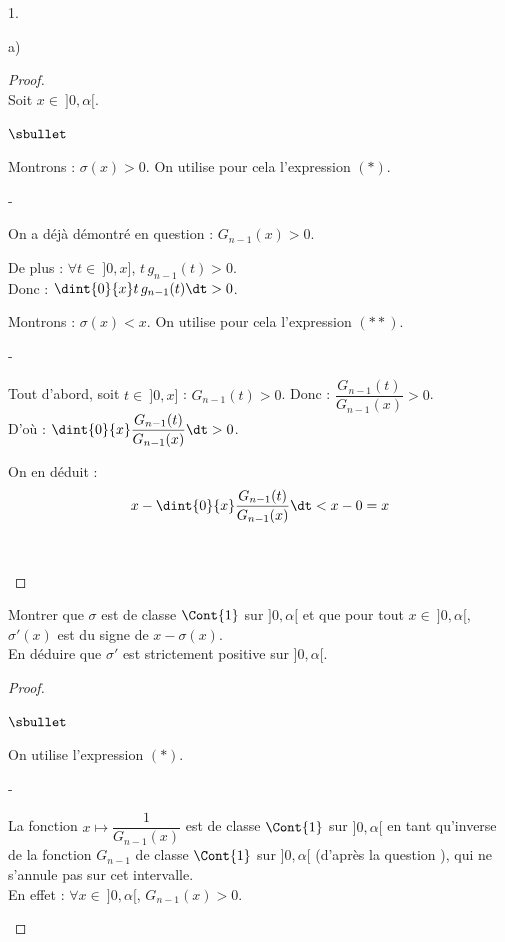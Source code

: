 \begin{noliste}{1.}
\begin{noliste}{a)}
    \begin{proof}~\\
      Soit $x \in \ ]0,\alpha[$.
      \begin{noliste}{$\sbullet$}
	\item Montrons : $\sigma(x) >0$. On utilise pour cela 
	l'expression $(*)$.
	\begin{noliste}{-}
	  \item On a déjà démontré en question  : 
	  $G_{n-1}(x) >0$.
	  
	  \item De plus : $\forall t \in \ ]0,x]$, $t \, g_{n-1}(t)
	  >0$.\\[.1cm]
	  Donc : $\dint{0}{x} t \, g_{n-1}(t) \dt >0$.
	\end{noliste}
	
	\item Montrons : $\sigma(x) < x$. On utilise pour cela 
	l'expression $(**)$.
	\begin{noliste}{-}
	  \item Tout d'abord, soit $t \in \ ]0,x]$ : 
	  $G_{n-1}(t) >0$. Donc : $\dfrac{G_{n-1}(t)}{G_{n-1}(x)}
	  >0$.\\[.1cm]
	  D'où : $\dint{0}{x} \dfrac{G_{n-1}(t)}{G_{n-1}(x)} \dt >0$.
	  
	  \item On en déduit :
	  \[
	    x - \dint{0}{x} \dfrac{G_{n-1}(t)}{G_{n-1}(x)} \dt
	    < x-0 = x
	  \]
	\end{noliste}
	~\\[-1.6cm]
      \end{noliste}
    \end{proof}

    
    \item Montrer que $\sigma$ est de classe $\Cont{1}$ sur $]0,\alpha[$
    et que pour tout $x \in \ ]0,\alpha[$, $\sigma'(x)$ est du signe 
    de $x- \sigma(x)$.\\
    En déduire que $\sigma'$ est strictement positive sur $]0,\alpha[$.
    
    \begin{proof}~
      \begin{noliste}{$\sbullet$}
	\item On utilise l'expression $(*)$.
	\begin{noliste}{-}
	  \item La fonction $x \mapsto \dfrac{1}{G_{n-1}(x)}$ est de 
	  classe $\Cont{1}$ sur $]0, \alpha[$ en tant qu'inverse de 
	  la fonction $G_{n-1}$ de classe $\Cont{1}$ sur $]0,\alpha[$
	  (d'après la question ), qui ne s'annule pas 
	  sur cet intervalle.\\
	  En effet : $\forall x \in \ ]0,\alpha[$, $G_{n-1}(x)>0$.
	  

\end{noliste}
\end{noliste}
\end{proof}
\end{noliste}
\end{noliste}

